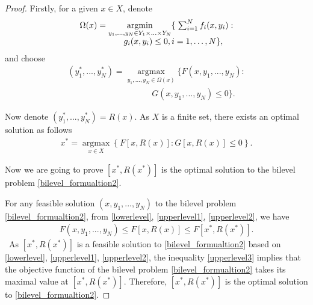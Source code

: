 \documentclass[10pt,journal]{IEEEtran}
\theoremstyle{definition}
\theoremstyle{plain} \newtheorem{theo}{Theorem} \newtheorem{prop}{Proposition}  \newtheorem{lemm}{Lemma}
\begin{document}
\begin{proof}
Firstly, for a given $x \in X$, denote  
\begin{equation} \label{lowerlevel}
\begin{array}{cc}
\Omega(x) = \underset{y_1,...,y_N \in Y_1\times ...\times Y_N} {\operatorname{argmin}} \lbrace \hspace{1mm} \sum_{i=1}^N f_i(x,y_i): \\ \quad \quad \quad \quad g_i(x,y_i)\leq 0,  i=1,\dots,N \rbrace,
\end{array}
\end{equation}
and choose 
\begin{equation} \label{upperlevel1}
\begin{array}{cc}
(y_1^*,...,y_N^*) = \underset{y_1,...,y_N \in \Omega(x)} {\operatorname{argmax}} \{ F(x,y_1,...,y_N) : \\ \quad \quad \quad \quad \quad \quad \quad \quad \quad \quad   G(x,y_1,...,y_N) \leq 0 \}.
\end{array}
\end{equation}

Now denote $(y_1^*,...,y_N^*) = R(x)$. As $X$ is a finite set, there exists an optimal solution as follows
\begin{equation} \label{upperlevel2}
\begin{array}{cc}
x^* = \underset{x \in X} {\operatorname{argmax}} \left\lbrace F[x,R(x)] : G[x,R(x)] \leq 0 \right\rbrace.
\end{array}
\end{equation}

Now we are going to prove $[x^*, R(x^*)]$ is the optimal solution to the bilevel problem \eqref{bilevel_formualtion2}.

For any feasible solution $(x,y_1,...,y_N)$ to the bilevel problem \eqref{bilevel_formualtion2}, from \eqref{lowerlevel}, \eqref{upperlevel1}, \eqref{upperlevel2}, we have
\begin{equation} \label{upperlevel3}
\begin{array}{cc}
F(x,y_1,...,y_N)  \leq F[x,R(x)] \leq F[x^*,R(x^*)].
\end{array}
\end{equation}\
As $[x^*, R(x^*)]$ is a feasible solution to \eqref{bilevel_formualtion2} based on \eqref{lowerlevel}, \eqref{upperlevel1}, \eqref{upperlevel2}, the inequality \eqref{upperlevel3} implies that the objective function of the bilevel problem \eqref{bilevel_formualtion2} takes its maximal value at $[x^*, R(x^*)]$. Therefore, $[x^*, R(x^*)]$ is the optimal solution to \eqref{bilevel_formualtion2}.
\end{proof}
\end{document}
